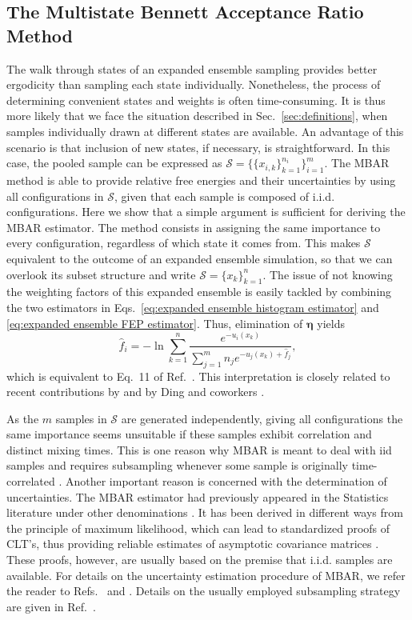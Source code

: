 \documentclass[
    journal=jctcce,
    layout=twocolumn
]{achemso}
\newcommand{\vt}[1]{\boldsymbol{\mathbf{#1}}}   %
\begin{document}
\subsection{The Multistate Bennett Acceptance Ratio Method}

The walk through states of an expanded ensemble sampling provides better ergodicity than sampling each state individually. Nonetheless, the process of determining convenient states and weights is often time-consuming. It is thus more likely that we face the situation described in Sec.~\ref{sec:definitions}, when samples individually drawn at different states are available. An advantage of this scenario is that inclusion of new states, if necessary, is straightforward. In this case, the pooled sample can be expressed as $\mathcal S = \big\{\{x_{i,k}\}_{k=1}^{n_i} \big\}_{i=1}^m$. The MBAR method \cite{Shirts_2008} is able to provide relative free energies and their uncertainties by using all configurations in $\mathcal S$, given that each sample is composed of i.i.d. configurations. Here we show that a simple argument is sufficient for deriving the MBAR estimator. The method consists in assigning the same importance to every configuration, regardless of which state it comes from. This makes $\mathcal S$ equivalent to the outcome of an expanded ensemble simulation, so that we can overlook its subset structure and write $\mathcal S = \{x_k\}_{k=1}^n$. The issue of not knowing the weighting factors of this expanded ensemble is easily tackled by combining the two estimators in Eqs.~\eqref{eq:expanded ensemble histogram estimator} and \eqref{eq:expanded ensemble FEP estimator}. Thus, elimination of $\vt \eta$ yields
\begin{equation}
\label{eq:mbar free energy estimator}
\hat f_i = -\ln \sum_{k=1}^n \frac{e^{-u_i(x_k)}}{\sum_{j=1}^m n_j e^{-u_j(x_k) + \hat f_j}},
\end{equation}
which is equivalent to Eq.~11 of Ref.~. This interpretation is closely related to recent contributions by \citeauthor{Shirts_2017} \cite{Shirts_2017} and by Ding and coworkers \cite{Ding_2017}.

As the $m$ samples in $\mathcal S$ are generated independently, giving all configurations the same importance seems unsuitable if these samples exhibit correlation and distinct mixing times. This is one reason why MBAR is meant to deal with iid samples and requires subsampling whenever some sample is originally time-correlated \cite{Shirts_2008}. Another important reason is concerned with the determination of uncertainties. The MBAR estimator had previously appeared in the Statistics literature under other denominations \cite{Vardi_1985, Gill_1988, Geyer_1994, Meng_1996, Kong_2003, Tan_2004}. It has been derived in different ways from the principle of maximum likelihood, which can lead to standardized proofs of CLT's, thus providing reliable estimates of asymptotic covariance matrices \cite{Pawitan_2001, Greene_2012}. These proofs, however, are usually based on the premise that i.i.d. samples are available. For details on the uncertainty estimation procedure of MBAR, we refer the reader to Refs.~ and . Details on the usually employed subsampling strategy are given in Ref.~.
\end{document}
